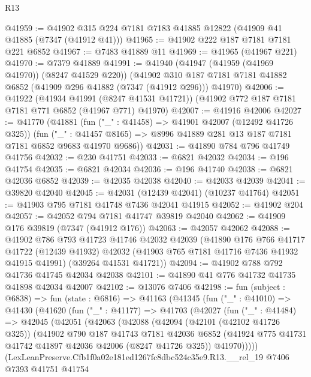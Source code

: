 \begin{lexlean}{R13}
\begin{coremodule}
@41959 := @41902 @315 @224 @7181 @7183 @41885 @12822 (@41909 @41 @41885 (@7347 (@41912 @41)))
@41965 := @41902 @222 @187 @7181 @7181 @221 @6852
@41967 := @7483 @41889 @11
@41969 := @41965 (@41967 @221)
@41970 := @7379 @41889
@41991 := @41940
    (@41947 (@41959 (@41969 @41970)) (@8247 @41529 @220))
    (@41902 @310 @187 @7181 @7181 @41882 @6852 (@41909 @296 @41882 (@7347 (@41912 @296))) @41970)
@42006 := @41922
    (@41934 @41991 (@8247 @41531 @41721))
    (@41902 @772 @187 @7181 @7181 @771 @6852 (@41967 @771) @41970)
@42007 := @41916 @42006
@42027 := @41770
    (@41881
      (fun ("_" : @41458) => @41901 @42007 (@12492 @41726 @325))
      (fun ("_" : @41457 @8165) => @8996 @41889 @281 @13 @187 @7181 @7181 @6852 @9683 @41970 @9686))
@42031 := @41890 @784 @796 @41749 @41756
@42032 := @230 @41751
@42033 := @6821 @42032
@42034 := @196 @41754
@42035 := @6821 @42034
@42036 := @196 @41740
@42038 := @6821 @42036 @6852
@42039 := @42035 @42038
@42040 := @42033 @42039
@42041 := @39820 @42040
@42045 := @42031 (@12439 @42041) (@10237 @41764)
@42051 := @41903 @795 @7181 @41748 @7436 @42041 @41915
@42052 := @41902 @204
@42057 := @42052 @794 @7181 @41747 @39819 @42040
@42062 := @41909 @176 @39819 (@7347 (@41912 @176))
@42063 := @42057 @42062
@42088 := @41902
    @786
    @793
    @41723
    @41746
    @42032
    @42039
    (@41890
      @176
      @766
      @41717
      @41722
      (@12439 @41932)
      @42032
      (@41903 @765 @7181 @41716 @7436 @41932 @41915 @41991)
      (@39264 @41531 @41721))
@42094 := @41902 @788 @792 @41736 @41745 @42034 @42038
@42101 := @41890 @41 @776 @41732 @41735 @41898 @42034 @42007
@42102 := @13076 @7406
@42198 := fun (subject : @6838) =>
  fun (state : @6816) =>
  @41163
    (@41345
      (fun ("_" : @41010) =>
      @41430
        (@41620
          (fun ("_" : @41177) =>
          @41703
            (@42027
              (fun ("_" : @41484) =>
              @42045
                (@42051
                  (@42063
                    (@42088
                      (@42094
                        (@42101 (@42102 @41726 @325))
                        (@41902
                          @790
                          @187
                          @41743
                          @7181
                          @42036
                          @6852
                          (@41924 @775 @41731 @41742 @41897 @42036 @42006 (@8247 @41726 @325))
                          @41970)))))
                (LexLeanPreserve.Cfb1f0a02e181ed1267fc8dbc524c35e9.R13.__rel_19
                  @7406
                  @7393
                  @41751
                  @41754

\end{coremodule}
\end{lexlean}
